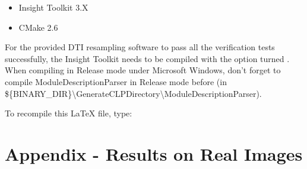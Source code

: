 \documentclass{InsightArticle}
\begin{document}
\begin{itemize}
  \item  Insight Toolkit 3.X
  \item  CMake 2.6
\end{itemize}
For the provided DTI resampling software to pass all the verification tests successfully, the Insight Toolkit needs to be compiled with the option  turned . When compiling in Release mode under Microsoft Windows, don't forget to compile ModuleDescriptionParser in Release mode before (in \$\{BINARY\_DIR\}\textbackslash GenerateCLPDirectory\textbackslash ModuleDescriptionParser).

To recompile this LaTeX file, type: 
%

\clearpage

\appendix

\section{Appendix - Results on Real Images}
\end{document}
